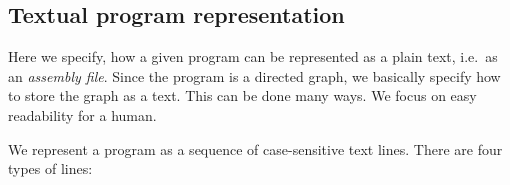 \documentclass[10pt,twocolumn]{article}
\begin{document}


\subsection{Textual program representation}
\label{sec:microcode:assembly}

Here we specify, how a given program can be represented as a plain text, i.e.~as
an \emph{assembly file}. Since the program is a directed graph, we basically
specify how to store the graph as a text. This can be done many ways. We focus
on easy readability for a human.

We represent a program as a sequence of case-sensitive text lines. There are
four types of lines:
\end{document}
